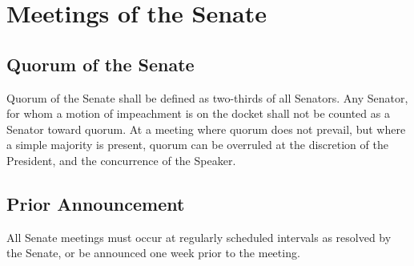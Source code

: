 \documentclass[12pt]{scrreprt}
\begin{document}
\section{Meetings of the Senate}

\subsection{Quorum of the Senate}
Quorum of the Senate shall be defined as two-thirds of all Senators. Any 
Senator, for whom a motion of impeachment is on the docket shall not be counted as a 
Senator toward quorum. At a meeting where quorum does not prevail, but where a simple majority is present, quorum can be overruled at the discretion of the President, and the 
concurrence of the Speaker. 

\subsection{Prior Announcement}
All Senate meetings must occur at regularly scheduled intervals as
resolved by the Senate, or be announced one week prior to the meeting.
\end{document}
